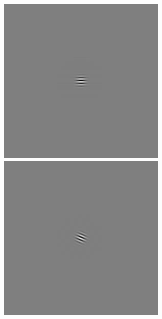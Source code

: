 \begin{figure}[ht]
\begin{center}
 \includegraphics[width=\columnwidth/9]{ch4/figures/rGabor0_4.jpg}
 \includegraphics[width=\columnwidth/9]{ch4/figures/rGabor0_5.jpg}

\end{center}
\end{figure}
